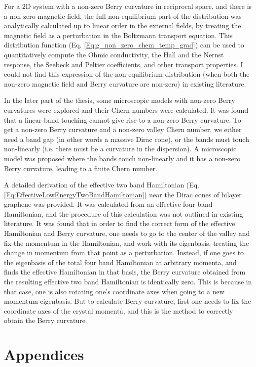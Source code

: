 \documentclass{report}
\begin{document}
For a 2D system with a non-zero Berry curvature in reciprocal space, and there is a non-zero magnetic field, the full non-equilibrium part of the distribution was analytically calculated up to linear order in the external fields, by treating the magnetic field as a perturbation in the Boltzmann transport equation. This distribution function (Eq. \eqref{Eq:g_non_zero_chem_temp_grad}) can be used to quantitatively compute the Ohmic conductivity, the Hall and the Nernst response, the Seebeck and Peltier coefficients, and other transport properties. I could not find this expression of the non-equilibrium distribution (when both the non-zero magnetic field and Berry curvature are non-zero) in existing literature.

In the later part of the thesis, some microscopic models with non-zero Berry curvatures were explored and their Chern numbers were calculated. It was found that a linear band touching cannot give rise to a non-zero Berry curvature. To get a non-zero Berry curvature and a non-zero valley Chern number, we either need a band gap (in other words a massive Dirac cone), or the bands must touch non-linearly (i.e. there must be a curvature in the dispersion). A microscopic model was proposed where the bands touch non-linearly and it has a non-zero Berry curvature, leading to a finite Chern number.

A detailed derivation of the effective two band Hamiltonian (Eq. \eqref{Eq:EffectiveLowEnergyTwoBandHamiltonian}) near the Dirac cones of bilayer graphene was provided. It was calculated from an effective four-band Hamiltonian, and the procedure of this calculation was not outlined in existing literature. It was found that in order to find the correct form of the effective Hamiltonian and Berry curvature, one needs to go to the center of the valley and fix the momentum in the Hamiltonian, and work with its eigenbasis, treating the change in momentum from that point as a perturbation. Instead, if one goes to the eigenbasis of the total four band Hamiltonian at arbitrary momenta, and finds the effective Hamiltonian in that basis, the Berry curvature obtained from the resulting effective two band Hamiltonian is identically zero. This is because in that case, one is also rotating one's coordinate axes when going to a new momentum eigenbasis. But to calculate Berry curvature, first one needs to fix the coordinate axes of the crystal momenta, and this is the method to correctly obtain the Berry curvature.

\chapter*{\center Appendices}%
%
\appendix
\end{document}
